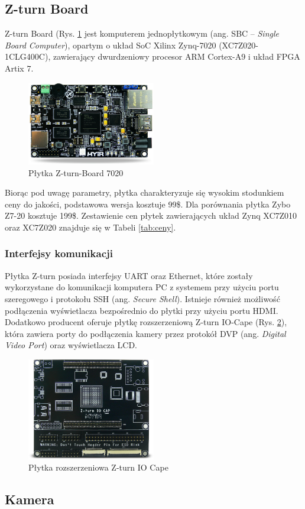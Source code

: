 \subsection{Z-turn Board}

Z-turn Board (Rys. \ref{zturn_board} jest komputerem jednopłytkowym (ang. SBC – \emph{Single Board Computer}),
opartym o układ SoC Xilinx Zynq-7020 (XC7Z020-1CLG400C), zawierający dwurdzeniowy 
procesor ARM Cortex-A9 i układ FPGA Artix 7. 

\begin{figure}[h]
  \centering
  \includegraphics[width=0.5\textwidth]{img/zturn_board.jpg}
  \caption{Płytka Z-turn-Board 7020}
  \label{zturn_board}
\end{figure}

Biorąc pod uwagę parametry, płytka 
charakteryzuje się wysokim stodunkiem ceny do jakości, podstawowa wersja kosztuje 
99\$. Dla porównania płytka Zybo Z7-20 kosztuje 199\$. Zestawienie cen płytek 
zawierających układ Zynq XC7Z010 oraz XC7Z020 znajduje się w Tabeli \ref{tab:ceny}. 

\subsubsection{Interfejsy komunikacji}

Płytka Z-turn posiada interfejsy UART oraz Ethernet, które zostały wykorzystane do 
komunikacji komputera PC z systemem przy użyciu portu szeregowego  
i protokołu SSH (ang. \emph{Secure Shell}). Istnieje również możliwość podłączenia 
wyświetlacza bezpośrednio do płytki przy użyciu portu HDMI. Dodatkowo producent 
oferuje płytkę rozszerzeniową Z-turn IO-Cape (Rys. \ref{iocape}), która zawiera 
porty do podłączenia kamery przez protokół DVP (ang. \emph{Digital Video Port}) 
oraz wyświetlacza LCD. 

\begin{figure}[h]
  \centering
  \includegraphics[width=0.5\textwidth]{img/iocape.png}
  \caption{Płytka rozszerzeniowa Z-turn IO Cape}
  \label{iocape}
\end{figure}

\subsection{Kamera}


